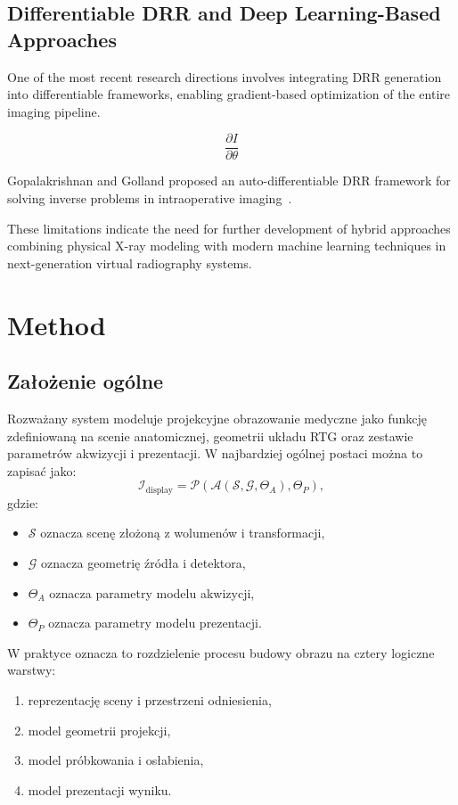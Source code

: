 \documentclass[11pt,a4paper]{article}
\begin{document}
\subsection{Differentiable DRR and Deep Learning-Based Approaches}

One of the most recent research directions involves integrating DRR generation into differentiable frameworks, enabling gradient-based optimization of the entire imaging pipeline.

\begin{equation}
\frac{\partial I}{\partial \theta}
\end{equation}

Gopalakrishnan and Golland proposed an auto-differentiable DRR framework for solving inverse problems in intraoperative imaging~\cite{Gopalakrishnan2022}.

These limitations indicate the need for further development of hybrid approaches combining physical X-ray modeling with modern machine learning techniques in next-generation virtual radiography systems.

\section{Method}

\subsection{Założenie ogólne}

Rozważany system modeluje projekcyjne obrazowanie medyczne jako funkcję zdefiniowaną
na scenie anatomicznej, geometrii układu RTG oraz zestawie parametrów akwizycji
i prezentacji. W najbardziej ogólnej postaci można to zapisać jako:
\[
\mathcal{I}_{\mathrm{display}} =
\mathcal{P}\!\left(
  \mathcal{A}\!\left(
    \mathcal{S}, \mathcal{G}, \Theta_A
  \right),
  \Theta_P
\right),
\]
gdzie:
\begin{itemize}
\item \(\mathcal{S}\) oznacza scenę złożoną z wolumenów i transformacji,
\item \(\mathcal{G}\) oznacza geometrię źródła i detektora,
\item \(\Theta_A\) oznacza parametry modelu akwizycji,
\item \(\Theta_P\) oznacza parametry modelu prezentacji.
\end{itemize}

W praktyce oznacza to rozdzielenie procesu budowy obrazu na cztery logiczne warstwy:
\begin{enumerate}[label=\arabic*.]
\item reprezentację sceny i przestrzeni odniesienia,
\item model geometrii projekcji,
\item model próbkowania i osłabienia,
\item model prezentacji wyniku.
\end{enumerate}
\end{document}
